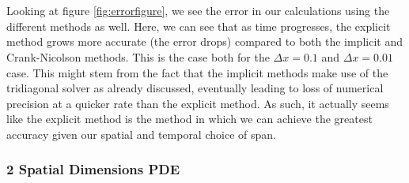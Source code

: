 \documentclass[reprint,english,notitlepage]{revtex4-1}  %
\begin{document}
\\
\\
Looking at figure \ref{fig:errorfigure}, we see the error in our calculations using the different methods as well. Here, we can see that as time progresses, the explicit method grows more accurate (the error drops) compared to both the implicit and Crank-Nicolson methods. This is the case both for the $\Delta x = 0.1$ and $\Delta x = 0.01$ case. This might stem from the fact that the implicit methods make use of the tridiagonal solver as already discussed, eventually leading to loss of numerical precision at a quicker rate than the explicit method. As such, it actually seems like the explicit method is the method in which we can achieve the greatest accuracy given our spatial and temporal choice of span.

\subsubsection{2 Spatial Dimensions PDE}
\end{document}
